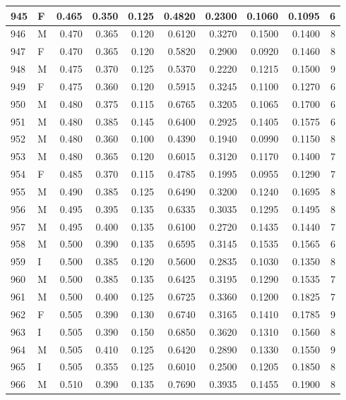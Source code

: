 \documentclass[9pt,twocolumn,twoside,]{pnas-new}
\begin{document}
\begin{tabular}{l|l|r|r|r|r|r|r|r|r}
\hline
945 & F & 0.465 & 0.350 & 0.125 & 0.4820 & 0.2300 & 0.1060 & 0.1095 & 6\\
\hline
946 & M & 0.470 & 0.365 & 0.120 & 0.6120 & 0.3270 & 0.1500 & 0.1400 & 8\\
\hline
947 & F & 0.470 & 0.365 & 0.120 & 0.5820 & 0.2900 & 0.0920 & 0.1460 & 8\\
\hline
948 & M & 0.475 & 0.370 & 0.125 & 0.5370 & 0.2220 & 0.1215 & 0.1500 & 9\\
\hline
949 & F & 0.475 & 0.360 & 0.120 & 0.5915 & 0.3245 & 0.1100 & 0.1270 & 6\\
\hline
950 & M & 0.480 & 0.375 & 0.115 & 0.6765 & 0.3205 & 0.1065 & 0.1700 & 6\\
\hline
951 & M & 0.480 & 0.385 & 0.145 & 0.6400 & 0.2925 & 0.1405 & 0.1575 & 6\\
\hline
952 & M & 0.480 & 0.360 & 0.100 & 0.4390 & 0.1940 & 0.0990 & 0.1150 & 8\\
\hline
953 & M & 0.480 & 0.365 & 0.120 & 0.6015 & 0.3120 & 0.1170 & 0.1400 & 7\\
\hline
954 & F & 0.485 & 0.370 & 0.115 & 0.4785 & 0.1995 & 0.0955 & 0.1290 & 7\\
\hline
955 & M & 0.490 & 0.385 & 0.125 & 0.6490 & 0.3200 & 0.1240 & 0.1695 & 8\\
\hline
956 & M & 0.495 & 0.395 & 0.135 & 0.6335 & 0.3035 & 0.1295 & 0.1495 & 8\\
\hline
957 & M & 0.495 & 0.400 & 0.135 & 0.6100 & 0.2720 & 0.1435 & 0.1440 & 7\\
\hline
958 & M & 0.500 & 0.390 & 0.135 & 0.6595 & 0.3145 & 0.1535 & 0.1565 & 6\\
\hline
959 & I & 0.500 & 0.385 & 0.120 & 0.5600 & 0.2835 & 0.1030 & 0.1350 & 8\\
\hline
960 & M & 0.500 & 0.385 & 0.135 & 0.6425 & 0.3195 & 0.1290 & 0.1535 & 7\\
\hline
961 & M & 0.500 & 0.400 & 0.125 & 0.6725 & 0.3360 & 0.1200 & 0.1825 & 7\\
\hline
962 & F & 0.505 & 0.390 & 0.130 & 0.6740 & 0.3165 & 0.1410 & 0.1785 & 9\\
\hline
963 & I & 0.505 & 0.390 & 0.150 & 0.6850 & 0.3620 & 0.1310 & 0.1560 & 8\\
\hline
964 & M & 0.505 & 0.410 & 0.125 & 0.6420 & 0.2890 & 0.1330 & 0.1550 & 9\\
\hline
965 & I & 0.505 & 0.355 & 0.125 & 0.6010 & 0.2500 & 0.1205 & 0.1850 & 8\\
\hline
966 & M & 0.510 & 0.390 & 0.135 & 0.7690 & 0.3935 & 0.1455 & 0.1900 & 8\\

\end{tabular}
\end{document}
